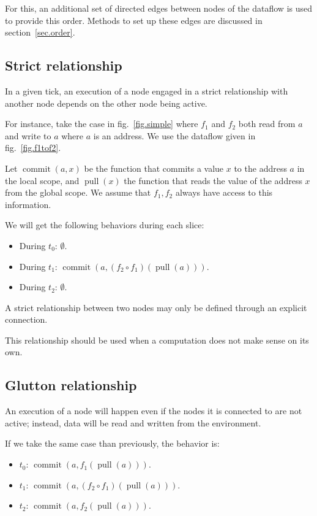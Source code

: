 \documentclass{article}
\DeclareMathOperator{\commit}{commit}
\DeclareMathOperator{\pull}{pull}
\begin{document}
For this, an additional set of directed edges between nodes of the dataflow is used to provide this order.
Methods to set up these edges are discussed in section~\ref{sec.order}.
\subsection{Strict relationship}
In a given tick, an execution of a node engaged in a strict relationship with another node depends on the other node being active.
        
For instance, take the case in fig.~\ref{fig.simple} where $f_1$ and $f_2$ both read from $a$ and write to $a$ where $a$ is an address.
We use the dataflow given in fig.~\ref{fig.f1tof2}.
    
Let $\commit(a, x)$ be the function that commits a value $x$ to the address $a$ in the local scope, and $\pull(x)$ the function that reads the value of the address $x$ from the global scope.
We assume that $f_1, f_2$ always have access to this information.
    
We will get the following behaviors during each slice: 
\begin{itemize}
  \item During $t_0$: $\emptyset$.
  \item During $t_1$: $\commit(a, (f_2 \circ f_1)(\pull(a)))$.
  \item During $t_2$: $\emptyset$. 
\end{itemize}

A strict relationship between two nodes may only be defined through an explicit connection.

This relationship should be used when a computation does not make sense on its own.

    
\subsection{Glutton relationship}
An execution of a node will happen even if the nodes it is connected to are not active; instead, data will be read and written from the environment.
    
If we take the same case than previously, the behavior is:
\begin{itemize}
  \item $t_0$: $\commit(a, f_1(\pull(a)))$.
  \item $t_1$: $\commit(a, (f_2 \circ f_1)(\pull(a)))$.
  \item $t_2$: $\commit(a, f_2(\pull(a)))$. 
\end{itemize}
\end{document}
